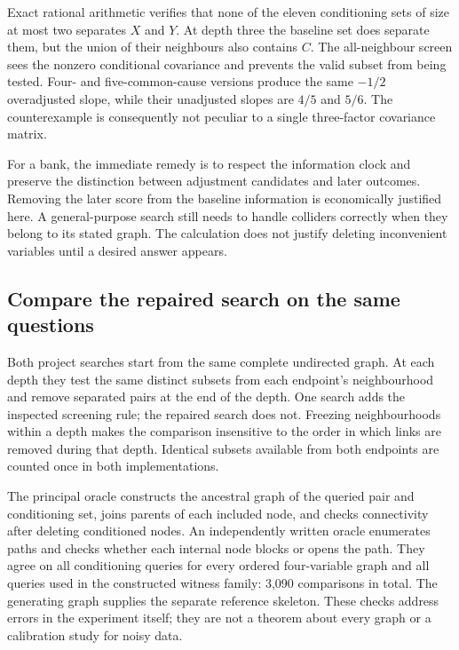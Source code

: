 Exact rational arithmetic verifies that none of the eleven conditioning sets
of size at most two separates $X$ and $Y$. At depth three the baseline set
does separate them, but the union of their neighbours also contains $C$.
The all-neighbour screen sees the nonzero conditional covariance and prevents
the valid subset from being tested. Four- and five-common-cause versions
produce the same $-1/2$ overadjusted slope, while their unadjusted slopes are
$4/5$ and $5/6$. The counterexample is consequently not peculiar to a single
three-factor covariance matrix.

For a bank, the immediate remedy is to respect the information clock and
preserve the distinction between adjustment candidates and later outcomes.
Removing the later score from the baseline information is economically
justified here. A general-purpose search still needs to handle colliders
correctly when they belong to its stated graph. The calculation does not
justify deleting inconvenient variables until a desired answer appears.

\subsection{Compare the repaired search on the same questions}

Both project searches start from the same complete undirected graph. At
each depth they test the same distinct subsets from each endpoint's
neighbourhood and remove separated pairs at the end of the depth. One search
adds the inspected screening rule; the repaired search does not. Freezing
neighbourhoods within a depth makes the comparison insensitive to the order
in which links are removed during that depth. Identical subsets available
from both endpoints are counted once in both implementations.

The principal oracle constructs the ancestral graph of the queried pair
and conditioning set, joins parents of each included node, and checks
connectivity after deleting conditioned nodes. An independently written
oracle enumerates paths and checks whether each internal node blocks or
opens the path. They agree on all conditioning queries for every ordered
four-variable graph and all queries used in the constructed witness family:
3,090 comparisons in total. The generating graph supplies the separate
reference skeleton. These checks address errors in the experiment itself;
they are not a theorem about every graph or a calibration study for noisy data.

